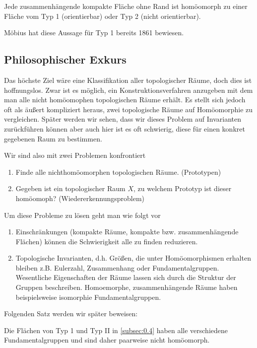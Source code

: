 \begin{prop}
\label{prop:0.4.1}
Jede zusammenhängende kompakte Fläche ohne Rand ist homöomorph zu einer Fläche
vom Typ 1 (orientierbar) oder Typ 2 (nicht orientierbar).\fishhere
\end{prop}

Möbius hat diese Aussage für Typ 1 bereits 1861 bewiesen.

\subsection{Philosophischer Exkurs}
\label{subsec:0.5}

Das höchste Ziel wäre eine Klassifikation aller topologischer Räume, doch dies
ist hoffnungslos. Zwar ist es möglich, ein Konstruktionsverfahren anzugeben mit
dem man alle nicht homöomophen topologischen Räume erhält. Es stellt sich
jedoch oft als äußert kompliziert heraus, zwei topologische Räume auf
Homöomorphie zu vergleichen. Später werden wir sehen, dass wir dieses Problem
auf Invarianten zurückführen können aber auch hier ist es oft schwierig, diese
für einen konkret gegebenen Raum zu bestimmen.

Wir sind also mit zwei Problemen konfrontiert
\begin{enumerate}[label=\arabic{*}.)]
  \item Finde alle nichthomöomorphen topologischen Räume. (Prototypen)
  \item Gegeben ist ein topologischer Raum $X$, zu welchem Prototyp ist dieser
  homöomoph? (Wiedererkennungsproblem)
\end{enumerate}

Um diese Probleme zu lösen geht man wie folgt vor
\begin{enumerate}[label=zu \arabic{*}.)]
  \item Einschränkungen (kompakte Räume, kompakte bzw. zusammenhängende
  Flächen) können die Schwierigkeit alle zu finden reduzieren.
  \item Topologische Invarianten, d.h. Größen, die unter Homöomorphismen
  erhalten bleiben z.B. Eulerzahl, Zusammenhang oder Fundamentalgruppen.\\
  Wesentliche Eigenschaften der Räume lassen sich durch die Struktur der
  Gruppen beschreiben. Homoemorphe, zusammenhängende Räume haben beispielsweise
  isomorphie Fundamentalgruppen.
\end{enumerate}

Folgenden Satz werden wir später beweisen:
\begin{prop}
\label{prop:0.5.1}
Die Flächen von Typ 1 und Typ II in \ref{subsec:0.4} haben alle verschiedene
Fundamentalgruppen und sind daher paarweise nicht homöomorph.\fishhere
\end{prop}
